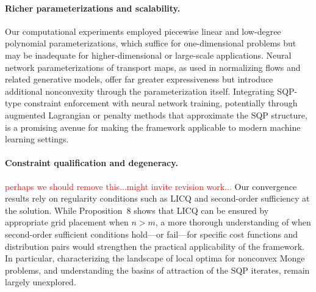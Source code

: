 \documentclass[12pt,leqno]{amsart}
\newcounter{experiment}
\newcommand{\harsha}[1]{\textcolor{red}{#1}}
\begin{document}
\paragraph{\bf Richer parameterizations and scalability.}
Our computational experiments employed piecewise linear and low-degree polynomial parameterizations, which suffice for one-dimensional problems but may be inadequate for higher-dimensional or large-scale applications. Neural network parameterizations of transport maps, as used in normalizing flows and related generative models, offer far greater expressiveness but introduce additional nonconvexity through the parameterization itself. Integrating SQP-type constraint enforcement with neural network training, potentially through augmented Lagrangian or penalty methods that approximate the SQP structure, is a promising avenue for making the framework applicable to modern machine learning settings.

\paragraph{\bf Constraint qualification and degeneracy.} \harsha{perhaps we should remove this...might invite revision work...}
Our convergence results rely on regularity conditions such as LICQ and second-order sufficiency at the solution. While Proposition~8 shows that LICQ can be ensured by appropriate grid placement when $n > m$, a more thorough understanding of when second-order sufficient conditions hold---or fail---for specific cost functions and distribution pairs would strengthen the practical applicability of the framework. In particular, characterizing the landscape of local optima for nonconvex Monge problems, and understanding the basins of attraction of the SQP iterates, remain largely unexplored.

\end{document}
